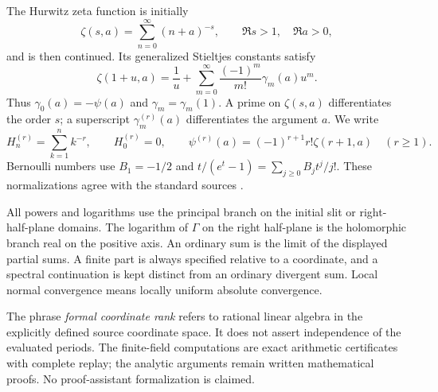 The Hurwitz zeta function is initially
\[
 \zeta(s,a)=\sum_{n=0}^{\infty}(n+a)^{-s},\qquad
 \Re s>1,\quad\Re a>0,
\]
and is then continued. Its generalized Stieltjes constants satisfy
\begin{equation}\label{eq:stieltjes-convention}
 \zeta(1+u,a)=\frac1u+
 \sum_{m=0}^{\infty}\frac{(-1)^m}{m!}\gamma_m(a)u^m.
\end{equation}
Thus $\gamma_0(a)=-\psi(a)$ and $\gamma_m=\gamma_m(1)$.
A prime on $\zeta(s,a)$ differentiates the order $s$; a superscript
$\gamma_m^{(r)}(a)$ differentiates the argument $a$. We write
\[
 H_n^{(r)}=\sum_{k=1}^n k^{-r},\qquad H_0^{(r)}=0,
 \qquad \psi^{(r)}(a)=(-1)^{r+1}r!\zeta(r+1,a)\quad(r\ge1).
\]
Bernoulli numbers use $B_1=-1/2$ and
$t/(e^t-1)=\sum_{j\ge0}B_jt^j/j!$.
These normalizations agree with the standard sources
\cite{DLMFZeta,DLMFPolygamma}.

All powers and logarithms use the principal branch on the initial slit
or right-half-plane domains. The logarithm of $\Gamma$ on the right
half-plane is the holomorphic branch real on the positive axis.
An ordinary sum is the limit of the displayed partial sums. A finite
part is always specified relative to a coordinate, and a spectral
continuation is kept distinct from an ordinary divergent sum.
Local normal convergence means locally uniform absolute convergence.

The phrase \emph{formal coordinate rank} refers to rational linear
algebra in the explicitly defined source coordinate space. It does not
assert independence of the evaluated periods. The finite-field
computations are exact arithmetic certificates with complete replay;
the analytic arguments remain written mathematical proofs. No
proof-assistant formalization is claimed.
